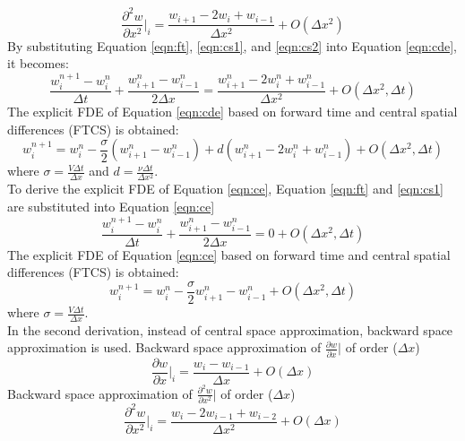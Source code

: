 \documentclass[letterpaper,12pt]{article}
\begin{document}
\begin{equation}
	\frac{\partial^2 w}{\partial x^2}\vert_{i}=\frac{w_{i+1}-2w_i+w_{i-1}}{\Delta x^2}+O(\Delta x^2)
	\label{eqn:cs2}
\end{equation}
By substituting Equation \ref{eqn:ft}, \ref{eqn:cs1}, and \ref{eqn:cs2} into Equation \ref{eqn:cde}, it becomes:
\begin{equation}
	\frac{w_{i}^{n+1}-{w_{i}^{n}}}{\Delta t}+\frac{w_{i+1}^{n}-w_{i-1}^{n}}{2\Delta x}
	=\frac{w_{i+1}^{n}-2w_{i}^{n}+w_{i-1}^{n}}{\Delta x^2}+O(\Delta x^2, \Delta t)
\end{equation}
The explicit FDE of Equation \ref{eqn:cde} based on forward time and central spatial differences (FTCS) is obtained:
\begin{equation}
	w_{i}^{n+1}= w_{i}^{n}-\frac{\sigma}{2}(w_{i+1}^{n}-w_{i-1}^{n})+d(w_{i+1}^{n}-2w_{i}^{n}+w_{i-1}^{n})+O(\Delta x^2,\Delta t)
	\label{eqn:FTCS}
\end{equation}
where $\sigma = \frac{V\Delta t}{\Delta x }$ and $d = \frac{\nu\Delta t}{\Delta x^2 }$.
\\To derive the explicit FDE of Equation \ref{eqn:ce}, Equation \ref{eqn:ft} and \ref{eqn:cs1} are
substituted into Equation \ref{eqn:ce}
\begin{equation}
	\frac{w_{i}^{n+1}-{w_{i}^{n}}}{\Delta t}+\frac{w_{i+1}^{n}-w_{i-1}^{n}}{2\Delta x}
	=0+O(\Delta x^2, \Delta t)
\end{equation}
The explicit FDE of Equation \ref{eqn:ce} based on forward time and central spatial differences (FTCS) is obtained:
\begin{equation}
	w_{i}^{n+1}= w_{i}^{n}-\frac{\sigma}{2}w_{i+1}^{n}-w_{i-1}^{n}+O(\Delta x^2, \Delta t)
\end{equation}
where $\sigma = \frac{V\Delta t}{\Delta x }$.
\\In the second derivation, instead of central space approximation, backward space approximation is used.
Backward space approximation of $\frac{\partial w}{\partial x}\vert$ of order ($\Delta x$)
\begin{equation}
	\frac{\partial w}{\partial x}\vert_{i}=\frac{w_{i}-w_{i-1}}{\Delta x}+O(\Delta x)
	\label{eqn:bs1}
\end{equation}
Backward space approximation of $\frac{\partial^2 w}{\partial x^2}\vert$ of order ($\Delta x$)
\begin{equation}
	\frac{\partial^2 w}{\partial x^2}\vert_{i}=\frac{w_{i}-2w_{i-1}+w_{i-2}}{\Delta x^2}+O(\Delta x)
	\label{eqn:bs2}
\end{equation}
\end{document}
